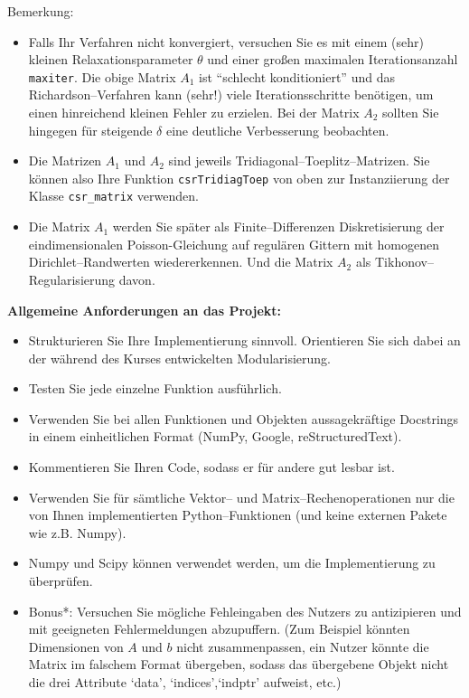 	Bemerkung:\begin{itemize}
		\item  Falls Ihr Verfahren nicht konvergiert, versuchen Sie es mit einem (sehr) kleinen Relaxationsparameter $\theta$ und einer großen maximalen Iterationsanzahl \texttt{maxiter}. Die obige Matrix $A_1$ ist ``schlecht konditioniert'' und das Richardson--Verfahren kann (sehr!) viele Iterationsschritte benötigen, um einen hinreichend kleinen Fehler zu erzielen. Bei der Matrix $A_2$ sollten Sie hingegen für steigende $\delta$ eine deutliche Verbesserung beobachten.
		\item Die Matrizen $A_1$ und $A_2$ sind jeweils Tridiagonal--Toeplitz--Matrizen. Sie können also Ihre Funktion \texttt{csrTridiagToep} von oben zur Instanziierung der Klasse \texttt{csr\_matrix} verwenden.
		\item Die Matrix $A_1$ werden Sie später als Finite--Differenzen Diskretisierung der eindimensionalen Poisson-Gleichung auf regulären Gittern mit homogenen Dirichlet--Randwerten wiedererkennen. Und die Matrix $A_2$ als Tikhonov--Regularisierung davon.
	\end{itemize}




  
\textbf{Allgemeine Anforderungen an das Projekt:}\\
	
	\begin{itemize}
		\item Strukturieren Sie Ihre Implementierung sinnvoll. Orientieren Sie sich dabei an der während des Kurses entwickelten Modularisierung.
		\item Testen Sie jede einzelne Funktion ausführlich.
		\item Verwenden Sie bei allen Funktionen und Objekten aussagekräftige Docstrings in einem einheitlichen Format (NumPy, Google, reStructuredText).
		\item Kommentieren Sie Ihren Code, sodass er für andere gut lesbar ist.
		\item Verwenden Sie für sämtliche Vektor-- und Matrix--Rechenoperationen nur die von Ihnen implementierten Python--Funktionen (und keine externen Pakete wie z.B. Numpy).
		\item Numpy und Scipy können verwendet werden, um die Implementierung zu überprüfen.
		\item Bonus*: Versuchen Sie mögliche Fehleingaben des Nutzers zu antizipieren und mit geeigneten Fehlermeldungen abzupuffern.	(Zum Beispiel könnten Dimensionen von $A$ und $b$ nicht zusammenpassen, ein Nutzer könnte die Matrix im falschem Format übergeben, sodass das übergebene Objekt nicht die drei Attribute `data', `indices',`indptr' aufweist, etc.)
	\end{itemize}



